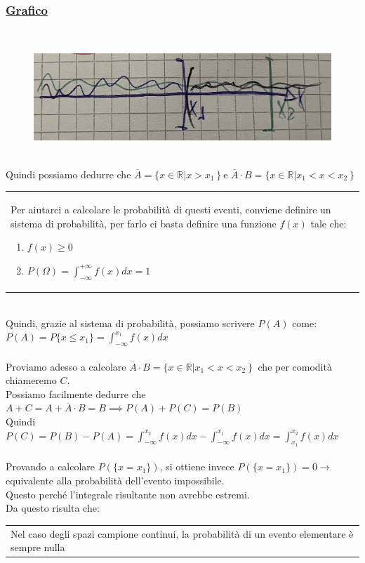 \documentclass{article}
\begin{document}
\subsubsection{\underline{Grafico}} ~\\
\begin{figure}[ht]
\centering
\includegraphics[scale=0.13]{images/23.Par4.9.jpeg} 
\end{figure} \\
Quindi possiamo dedurre che $\overline {A}= \{ x\in \mathbb{R} \left | x> x_1\right \}$e
$\overline{A}\cdot B=\{x\in\mathbb{R}\left|x_1<x<x_2\right\}$ \\
\begin{tabular}{|p{13cm}}
Per aiutarci a calcolare le probabilità di questi eventi, conviene definire un sistema di probabilità, per farlo ci basta definire una funzione $f(x)$ tale che:
\begin{enumerate}
    \item $f(x) \geq 0$
    \item $P(\Omega) = \int_{- \infty}^{+ \infty} f(x) dx = 1$
\end{enumerate}
\end{tabular} \\
Quindi, grazie al sistema di probabilità, possiamo scrivere $P(A)$ come: $P(A) = P\{x \leq x_1 \} = \int_{-\infty}^{x_1} f(x) dx$ \\ \\
Proviamo adesso a calcolare $\overline{A}\cdot B=\{x\in\mathbb{R}\left|x_1<x<x_2\right\}$ che per
comodità chiameremo $C$. \\
Possiamo facilmente dedurre che $A + C = A+ \overline A \cdot B = B \implies P(A) +P(C) = P(B)$ \\
Quindi $P(C) = P(B) - P(A) = \int_{- \infty}^{x_2} f(x) dx - \int_{-\infty}^{x_1} f(x) dx = \int_{x_1}^{x_2} f(x)dx$ \\ \\
Provando a calcolare $P\left(\{x=x_1\}\right)$, si ottiene invece $P\left(\{x=x_1\}\right)=0\to$ equivalente alla probabilità dell'evento impossibile. \\
Questo perché l’integrale risultante non avrebbe estremi. \\
Da questo risulta che: \\
\begin{tabular}{|p{13cm}}
Nel caso degli spazi campione continui, la probabilità di un evento elementare è sempre nulla
\end{tabular}
\end{document}
